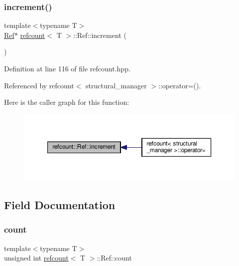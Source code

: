 \subsubsection{\texorpdfstring{increment()}{increment()}}
{\footnotesize\ttfamily template$<$typename T$>$ \\
\hyperlink{structrefcount_1_1Ref}{Ref}$\ast$ \hyperlink{structrefcount}{refcount}$<$ T $>$\+::Ref\+::increment (\begin{DoxyParamCaption}{ }\end{DoxyParamCaption})\hspace{0.3cm}{\ttfamily [inline]}}



Definition at line 116 of file refcount.\+hpp.



Referenced by refcount$<$ structural\+\_\+manager $>$\+::operator=().

Here is the caller graph for this function\+:
\nopagebreak
\begin{figure}[H]
\begin{center}
\leavevmode
\includegraphics[width=350pt]{d8/d95/structrefcount_1_1Ref_ae0677f2cf5a1ae75ab7af012f984cbce_icgraph}
\end{center}
\end{figure}


\subsection{Field Documentation}
\mbox{\label{structrefcount_1_1Ref_a7b5dc1520b87e74e2d6cdf3aa10e7eb3}} 
\subsubsection{\texorpdfstring{count}{count}}
{\footnotesize\ttfamily template$<$typename T$>$ \\
unsigned int \hyperlink{structrefcount}{refcount}$<$ T $>$\+::Ref\+::count}



